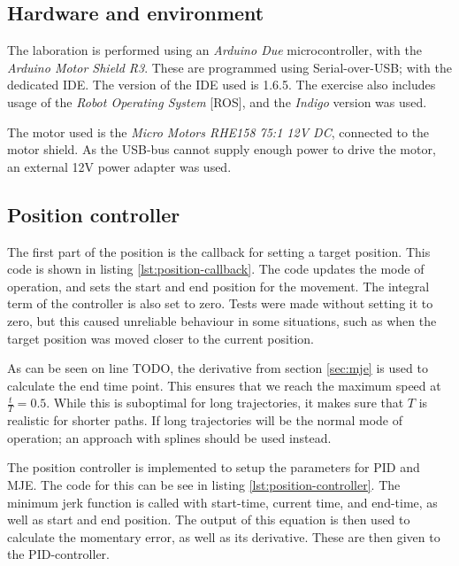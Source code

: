 \documentclass[11pt]{article}
\begin{document}
\subsection{Hardware and environment}
The laboration is performed using an \emph{Arduino Due} microcontroller, with the \emph{Arduino Motor Shield R3}. These are programmed using Serial-over-USB; with the dedicated IDE. The version of the IDE used is 1.6.5. The exercise also includes usage of the \emph{Robot Operating System} [ROS], and the \emph{Indigo} version was used. \par

The motor used is the \emph{Micro Motors RHE158 75:1 12V DC}, connected to the motor shield. As the USB-bus cannot supply enough power to drive the motor, an external 12V power adapter was used. 
\subsection{Position controller}
The first part of the position is the callback for setting a target position. This code is shown in listing \vref{lst:position-callback}. The code updates the mode of operation, and sets the start and end position for the movement. The integral term of the controller is also set to zero. Tests were made without setting it to zero, but this caused unreliable behaviour in some situations, such as when the target position was moved closer to the current position. \par

As can be seen on line TODO, the derivative from section \vref{sec:mje} is used to calculate the end time point. This ensures that we  reach the maximum speed at $\frac{t}{T} = 0.5$. While this is suboptimal for long trajectories, it makes sure that $T$ is realistic for shorter paths. If long trajectories will be the normal mode of operation; an approach with splines should be used instead. \par



The position controller is implemented to setup the parameters for PID and MJE. The code for this can be see in listing \vref{lst:position-controller}. The minimum jerk function is called with start-time, current time, and end-time, as well as start and end position. The output of this equation is then used to calculate the momentary error, as well as its derivative. These are then given to the PID-controller. \par
\end{document}
